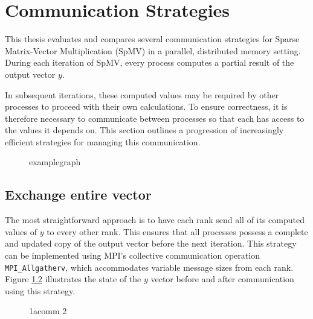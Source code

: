 \chapter{Communication Strategies}

This thesis evaluates and compares several communication strategies for Sparse Matrix-Vector Multiplication (SpMV) in a parallel, distributed memory setting. During each iteration of SpMV, every process computes a partial result of the output vector 
\(y\).
\medskip

In subsequent iterations, these computed values may be required by other processes to proceed with their own calculations. To ensure correctness, it is therefore necessary to communicate between processes so that each has access to the values it depends on. This section outlines a progression of increasingly efficient strategies for managing this communication.


\begin{figure}[ht]
    \centering
    \caption{examplegraph}
    \label{fig:examplegraph}
\end{figure}

\section{Exchange entire vector}


The most straightforward approach is to have each rank send all of its computed values of 
\(y\) to every other rank. This ensures that all processes possess a complete and updated copy of the output vector before the next iteration. This strategy can be implemented using MPI’s collective communication operation \texttt{MPI\_Allgatherv}, which accommodates variable message sizes from each rank. Figure \ref{fig:1acomm} illustrates the state of the \(y\) vector before and after communication using this strategy.



\begin{figure}[ht]
    \centering
    \caption{1acomm 2}
    \label{fig:1acomm}
\end{figure}



